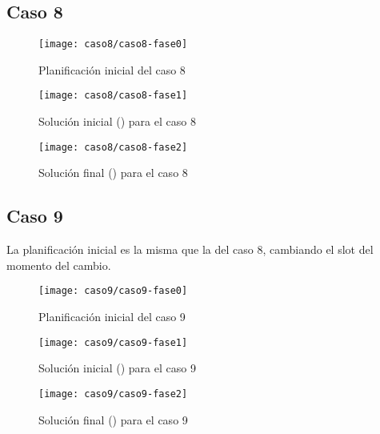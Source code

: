 \FloatBarrier
\newpage
\subsection{Caso 8}

\begin{figure}[!h]
	\centering
	\texttt{[image: caso8/caso8-fase0]}
	\caption{Planificación inicial del caso 8}
	\label{fig:caso8-fase0}
\end{figure}

\begin{figure}[!h]
	\centering
	\texttt{[image: caso8/caso8-fase1]}
	\caption{Solución inicial (\faseuno{}) para el caso 8}
	\label{fig:caso8-fase1}
\end{figure}

\begin{figure}[!h]
	\centering
	\texttt{[image: caso8/caso8-fase2]}
	\caption{Solución final (\fasedos{}) para el caso 8}
	\label{fig:caso8-fase2}
\end{figure}

\FloatBarrier
\newpage
\subsection{Caso 9}

La planificación inicial es la misma que la del caso 8, cambiando el slot del momento del cambio.

\begin{figure}[!h]
	\centering
	\texttt{[image: caso9/caso9-fase0]}
	\caption{Planificación inicial del caso 9}
	\label{fig:caso9-fase0}
\end{figure}

\begin{figure}[!h]
	\centering
	\texttt{[image: caso9/caso9-fase1]}
	\caption{Solución inicial (\faseuno{}) para el caso 9}
	\label{fig:caso9-fase1}
\end{figure}

\begin{figure}[!h]
	\centering
	\texttt{[image: caso9/caso9-fase2]}
	\caption{Solución final (\fasedos{}) para el caso 9}
	\label{fig:caso9-fase2}
\end{figure}
